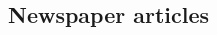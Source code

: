 \documentclass[12pt,oneside]{report}
\begin{document}
\begin{spacing}{1.2}
\color{blue}

\color{black}



\section{Newspaper articles}






\end{spacing}
\end{document}
